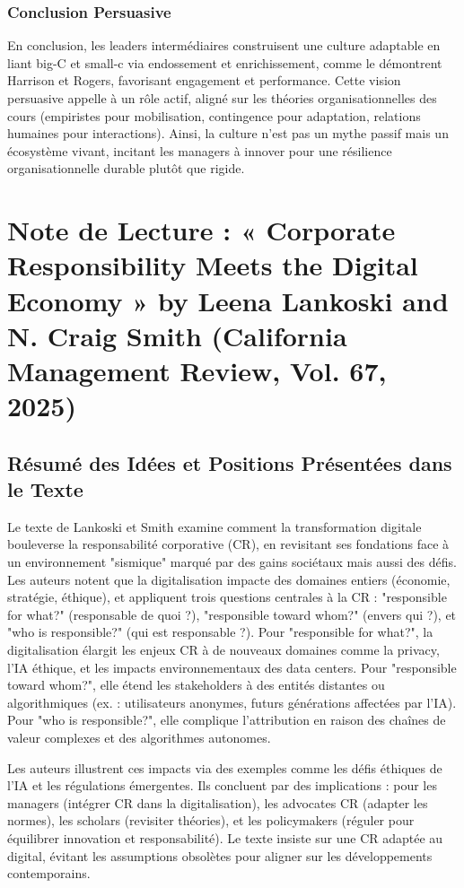 \documentclass{rapportECL}
\begin{document}
\subsubsection{Conclusion Persuasive}
En conclusion, les leaders intermédiaires construisent une culture adaptable en liant big-C et small-c via endossement et enrichissement, comme le démontrent Harrison et Rogers, favorisant engagement et performance. Cette vision persuasive appelle à un rôle actif, aligné sur les théories organisationnelles des cours (empiristes pour mobilisation, contingence pour adaptation, relations humaines pour interactions). Ainsi, la culture n'est pas un mythe passif mais un écosystème vivant, incitant les managers à innover pour une résilience organisationnelle durable plutôt que rigide.

\section{Note de Lecture : « Corporate Responsibility Meets the Digital Economy » by Leena Lankoski and N. Craig Smith (California Management Review, Vol. 67, 2025)}

\subsection{Résumé des Idées et Positions Présentées dans le Texte}
Le texte de Lankoski et Smith examine comment la transformation digitale bouleverse la responsabilité corporative (CR), en revisitant ses fondations face à un environnement "sismique" marqué par des gains sociétaux mais aussi des défis. Les auteurs notent que la digitalisation impacte des domaines entiers (économie, stratégie, éthique), et appliquent trois questions centrales à la CR : "responsible for what?" (responsable de quoi ?), "responsible toward whom?" (envers qui ?), et "who is responsible?" (qui est responsable ?). Pour "responsible for what?", la digitalisation élargit les enjeux CR à de nouveaux domaines comme la privacy, l'IA éthique, et les impacts environnementaux des data centers. Pour "responsible toward whom?", elle étend les stakeholders à des entités distantes ou algorithmiques (ex. : utilisateurs anonymes, futurs générations affectées par l'IA). Pour "who is responsible?", elle complique l'attribution en raison des chaînes de valeur complexes et des algorithmes autonomes.

Les auteurs illustrent ces impacts via des exemples comme les défis éthiques de l'IA et les régulations émergentes. Ils concluent par des implications : pour les managers (intégrer CR dans la digitalisation), les advocates CR (adapter les normes), les scholars (revisiter théories), et les policymakers (réguler pour équilibrer innovation et responsabilité). Le texte insiste sur une CR adaptée au digital, évitant les assumptions obsolètes pour aligner sur les développements contemporains.
\end{document}
